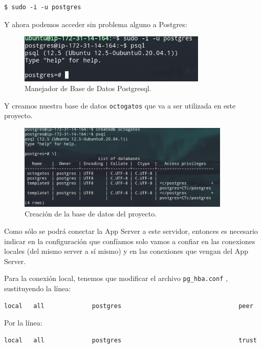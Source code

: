 \documentclass{article}
\newcommand{\ttt}[1]{%
\texttt{#1}%
}
\begin{document}
\begin{lstlisting}
$ sudo -i -u postgres
\end{lstlisting}

Y ahora podemos acceder sin problema alguno a Postgres:

\begin{figure}[H]
  \centering
  \includegraphics[width=0.8\textwidth]{DATASERVER/exhibitB}
  \caption{Manejador de Base de Datos Postgresql.}
  \label{fig:DATASERVER-B}
\end{figure}

Y creamos nuestra base de datos \ttt{octogatos} que va a ser
utilizada en este proyecto.

\begin{figure}[H]
  \centering
  \includegraphics[width=0.9\textwidth]{DATASERVER/exhibitC}
  \caption{Creación de la base de datos del proyecto.}
  \label{fig:DATASERVER-C}
\end{figure}

Como sólo se podrá conectar la App Server a este servidor,
entonces es necesario indicar en la configuración que
confíamos solo vamos a confiar en las conexiones locales
(del mismo server a sí mismo) y en las conexiones que vengan
del App Server.

Para la conexión local, tenemos que modificar el archivo
\ttt{pg\_hba.conf}, sustituyendo la línea:

\begin{lstlisting}
local   all             postgres                                peer
\end{lstlisting}

Por la línea:
\begin{lstlisting}
local   all             postgres                                trust
\end{lstlisting}
\end{document}
